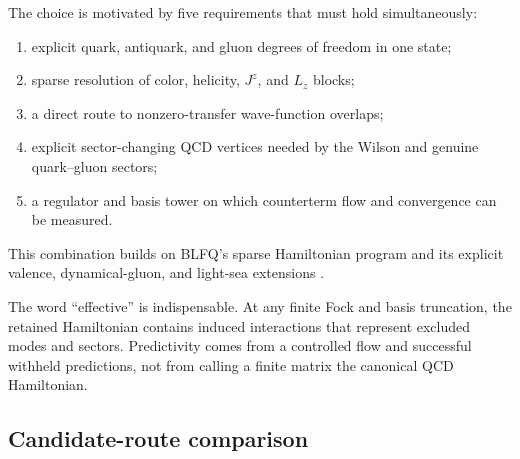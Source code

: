 \documentclass[11pt]{article}
\newcommand{\Lz}{L_z}
\newcommand{\Jz}{J^z}
\begin{document}
The choice is motivated by five requirements that must hold simultaneously:
\begin{enumerate}
 \item explicit quark, antiquark, and gluon degrees of freedom in one state;
 \item sparse resolution of color, helicity, \(\Jz\), and \(\Lz\) blocks;
 \item a direct route to nonzero-transfer wave-function overlaps;
 \item explicit sector-changing QCD vertices needed by the Wilson and genuine
 quark--gluon sectors;
 \item a regulator and basis tower on which counterterm flow and convergence can
 be measured.
\end{enumerate}
This combination builds on BLFQ's sparse Hamiltonian program and its explicit
valence, dynamical-gluon, and light-sea extensions
\cite{Vary2010,Xu2021,Xu2023,Xu2025,Mondal2025}.

The word ``effective'' is indispensable.  At any finite Fock and basis
truncation, the retained Hamiltonian contains induced interactions that
represent excluded modes and sectors.  Predictivity comes from a controlled
flow and successful withheld predictions, not from calling a finite matrix the
canonical QCD Hamiltonian.

\subsection{Candidate-route comparison}
\end{document}
